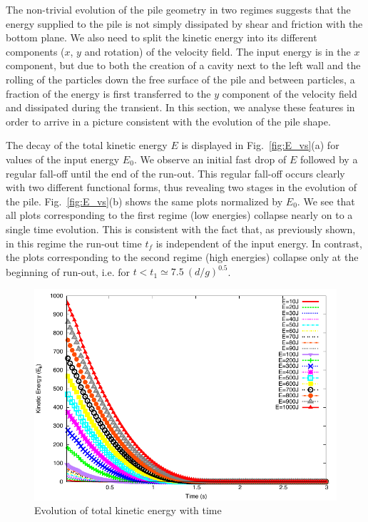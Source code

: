 The non-trivial evolution of the pile geometry  in two regimes suggests that 
the energy supplied to the pile is not simply dissipated by shear and friction 
with the bottom plane. We also need to split the kinetic energy into its 
different components ($x$, $y$ and rotation) of the velocity field. The input 
energy is in the $x$ component, but due to both the creation of a cavity next 
to the left wall and the rolling of the particles down the free surface of the 
pile and between particles, a fraction of the energy is first transferred to 
the $y$ component of the velocity field and dissipated  during the transient. 
In this section, we analyse these features  in order to arrive in a picture 
consistent with the evolution of the pile shape.  

The decay of the total kinetic energy $E$ is displayed in 
Fig.~\ref{fig:E_vs}(a) for values of the input energy $E_0$. We observe an 
initial fast drop of $E$ followed by a regular fall-off until the end of the 
run-out. This regular fall-off occurs clearly with two different functional 
forms, thus revealing two stages in the evolution of the pile. 
Fig.~\ref{fig:E_vs}(b) shows the same plots normalized by $E_0$. We see that 
all plots corresponding to the first regime (low energies) collapse nearly on 
to a single time evolution. 
This is consistent with the fact that, as previously shown, in this 
regime the run-out time $t_f$ is independent of the input energy. In contrast, 
the plots corresponding to the second regime (high energies) collapse only at 
the beginning of run-out, i.e. for $t < t_1 \simeq 7.5 \ (d/g)^{0.5}$.   

\begin{figure}[tbhp]
\centering
\includegraphics[width=\textwidth]{Energy_Slope}
\caption{Evolution of total kinetic energy with time}
\label{fig:energy_slope}
\end{figure}


